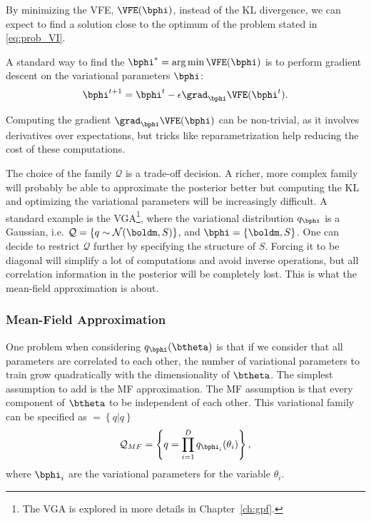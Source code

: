 By minimizing the \ac{VFE}, $\VFE(\bphi)$, instead of the \ac{KL} divergence, we can expect to find a solution close to the optimum of the problem stated in \eqref{eq:prob_VI}.

A standard way to find the $\bphi^* = \arg\min \VFE(\bphi)$ is to perform gradient descent on the variational parameters $\bphi$:
\begin{align}
\bphi^{t+1} = \bphi^{t} - \epsilon \grad_{\bphi}\VFE(\bphi^{t}).
\label{eq:vigraddescent}
\end{align}

Computing the gradient $\grad_{\bphi}\VFE(\bphi)$ can be non-trivial, as it involves derivatives over expectations, but tricks like reparametrization \cite{titsiasDoublyStochasticVariational} help reducing the cost of these computations.

The choice of the family $\mathcal{Q}$ is a trade-off decision.
A richer, more complex family will probably be able to approximate the posterior better but computing the \ac{KL} and optimizing the variational parameters will be increasingly difficult.
A standard example is the \ac{VGA}\footnote{The \ac{VGA} is explored in more details in Chapter~\ref{ch:gpf}.}, where the variational distribution $q_{\bphi}$ is a Gaussian, i.e. $\mathcal{Q} = \left\{q \sim \mathcal{N}(\boldm, S)\right\}$, and $\bphi = \{\boldm, S\}$.
One can decide to restrict $\mathcal{Q}$ further by specifying the structure of $S$.
Forcing it to be diagonal will simplify a lot of computations and avoid inverse operations, but all correlation information in the posterior will be completely lost.
This is what the mean-field approximation is about.

\subsubsection{Mean-Field Approximation}

One problem when considering $q_{\bphi}(\btheta)$ is that if we consider that all parameters are correlated to each other, the number of variational parameters to train grow quadratically with the dimensionality of $\btheta$.
The simplest assumption to add is the \ac{MF} approximation.
The \ac{MF} assumption is that every component of $\btheta$ to be independent of each other.
This variational family can be specified as $ = \left\{q | q \right\}$
\begin{align}
    \mathcal{Q}_{MF}= \left\{q = \prod_{i=1}^D q_{\bphi_i}(\theta_i)\right\},
\end{align}
where $\bphi_i$ are the variational parameters for the variable $\theta_i$.

